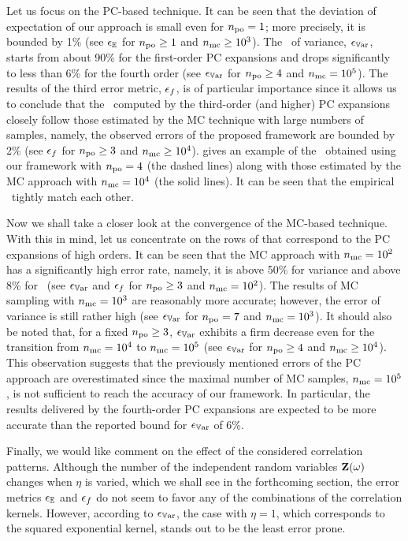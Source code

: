 Let us focus on the PC-based technique.
It can be seen that the deviation of expectation of our approach is small even for ${n_\text{po}} = 1$; more precisely, it is bounded by 1\% (see $\epsilon_\mathbb{E}$ for ${n_\text{po}} \geq 1$ and ${n_\text{mc}} \geq 10^3$).
The \nrmse\ of variance, $\epsilon_{\mathbb{V}\text{ar}}$, starts from about 90\% for the first-order PC expansions and drops significantly to less than 6\% for the fourth order (see $\epsilon_{\mathbb{V}\text{ar}}$ for ${n_\text{po}} \geq 4$ and ${n_\text{mc}} = 10^5$).
The results of the third error metric, $\epsilon_f$, is of particular importance since it allows us to conclude that the \pdfs\ computed by the third-order (and higher) PC expansions closely follow those estimated by the MC technique with large numbers of samples, namely, the observed errors of the proposed framework are bounded by 2\% (see $\epsilon_f$ for ${n_\text{po}} \geq 3$ and ${n_\text{mc}} \geq 10^4$).
 gives an example of the \pdf\ obtained using our framework with ${n_\text{po}} = 4$ (the dashed lines) along with those estimated by the MC approach with ${n_\text{mc}} = 10^4$ (the solid lines).
It can be seen that the empirical \pdfs\ tightly match each other.

Now we shall take a closer look at the convergence of the MC-based technique. With this in mind, let us concentrate on the rows of  that correspond to the PC expansions of high orders.
It can be seen that the MC approach with ${n_\text{mc}} = 10^2$ has a significantly high error rate, namely, it is above 50\% for variance and above 8\% for \pdfs\ (see $\epsilon_{\mathbb{V}\text{ar}}$ and $\epsilon_f$ for ${n_\text{po}} \geq 3$ and ${n_\text{mc}} = 10^2$).
The results of MC sampling with ${n_\text{mc}} = 10^3$ are reasonably more accurate; however, the error of variance is still rather high (see $\epsilon_{\mathbb{V}\text{ar}}$ for ${n_\text{po}} = 7$ and ${n_\text{mc}} = 10^3$).
It should also be noted that, for a fixed ${n_\text{po}} \geq 3$, $\epsilon_{\mathbb{V}\text{ar}}$ exhibits a firm decrease even for the transition from ${n_\text{mc}} = 10^4$ to ${n_\text{mc}} = 10^5$ (see $\epsilon_{\mathbb{V}\text{ar}}$ for ${n_\text{po}} \geq 4$ and ${n_\text{mc}} \geq 10^4$).
This observation suggests that the previously mentioned errors of the PC approach are overestimated since the maximal number of MC samples, ${n_\text{mc}} = 10^5$, is not sufficient to reach the accuracy of our framework.
In particular, the results delivered by the fourth-order PC expansions are expected to be more accurate than the reported bound for $\epsilon_{\mathbb{V}\text{ar}}$ of 6\%.

Finally, we would like comment on the effect of the considered correlation patterns.
Although the number of the independent random variables $\mathbf{Z}(\omega)$ changes when $\eta$ is varied, which we shall see in the forthcoming section, the error metrics $\epsilon_\mathbb{E}$ and $\epsilon_f$ do not seem to favor any of the combinations of the correlation kernels.
However, according to $\epsilon_{\mathbb{V}\text{ar}}$, the case with $\eta = 1$, which corresponds to the squared exponential kernel, stands out to be the least error prone.

